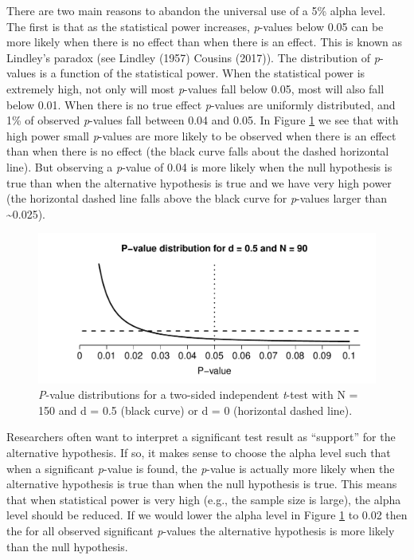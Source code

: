 \documentclass[,jou,floatsintext]{apa6}
\begin{document}
There are two main reasons to abandon the universal use of a 5\% alpha level. The first is that as the statistical power increases, \emph{p}-values below 0.05 can be more likely when there is no effect than when there is an effect. This is known as Lindley's paradox (see Lindley (1957) Cousins (2017)). The distribution of \emph{p}-values is a function of the statistical power. When the statistical power is extremely high, not only will most \emph{p}-values fall below 0.05, most will also fall below 0.01. When there is no true effect \emph{p}-values are uniformly distributed, and 1\% of observed \emph{p}-values fall between 0.04 and 0.05. In Figure \ref{fig:p-plot} we see that with high power small \emph{p}-values are more likely to be observed when there is an effect than when there is no effect (the black curve falls about the dashed horizontal line). But observing a \emph{p}-value of 0.04 is more likely when the null hypothesis is true than when the alternative hypothesis is true and we have very high power (the horizontal dashed line falls above the black curve for \emph{p}-values larger than \textasciitilde0.025).

\begin{figure}
\centering
\includegraphics{Justify_files/figure-latex/p-plot-1.pdf}
\caption{\label{fig:p-plot}\emph{P}-value distributions for a two-sided independent \emph{t}-test with N = 150 and d = 0.5 (black curve) or d = 0 (horizontal dashed line).}
\end{figure}

Researchers often want to interpret a significant test result as \enquote{support} for the alternative hypothesis. If so, it makes sense to choose the alpha level such that when a significant \emph{p}-value is found, the \emph{p}-value is actually more likely when the alternative hypothesis is true than when the null hypothesis is true. This means that when statistical power is very high (e.g., the sample size is large), the alpha level should be reduced. If we would lower the alpha level in Figure \ref{fig:p-plot} to 0.02 then the for all observed significant \emph{p}-values the alternative hypothesis is more likely than the null hypothesis.
\end{document}
